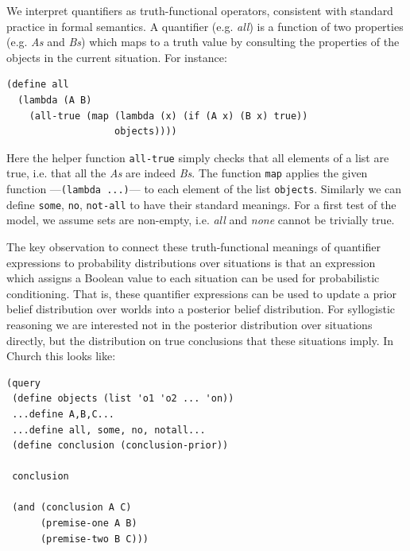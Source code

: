 \documentclass[10pt,letterpaper]{article}
\begin{document}
%
%




We interpret quantifiers as truth-functional operators, consistent with standard practice in formal semantics.
A quantifier (e.g. \emph{all}) is a function of two properties (e.g. \emph{As} and \emph{Bs}) which maps to a truth value by consulting the properties of the objects in the current situation. For instance:
\begin{lstlisting}
(define all 
  (lambda (A B) 
    (all-true (map (lambda (x) (if (A x) (B x) true)) 
                   objects))))
\end{lstlisting}
Here the helper function \lstinline{all-true} simply checks that all elements of a list are true, i.e. that all the \emph{As} are indeed \emph{Bs}. The function \lstinline{map} applies the given function ---\lstinline{(lambda ...)}--- to each element of the list \lstinline{objects}. Similarly we can define \lstinline{some}, \lstinline{no}, \lstinline{not-all} to have their standard meanings. For a first test of the model, we assume sets are non-empty, i.e. \emph{all} and \emph{none} cannot be trivially true.

The key observation to connect these truth-functional meanings of quantifier expressions to probability distributions over situations is that an expression which assigns a Boolean value to each situation can be used for probabilistic conditioning. That is, these quantifier expressions can be used to update a prior belief distribution over worlds into a posterior belief distribution. For syllogistic reasoning we are interested not in the posterior distribution over situations directly, but the distribution on true conclusions that these situations imply. In Church this looks like:
\begin{lstlisting}
(query
 (define objects (list 'o1 'o2 ... 'on))
 ...define A,B,C...
 ...define all, some, no, notall...
 (define conclusion (conclusion-prior))
 
 conclusion
 
 (and (conclusion A C) 
      (premise-one A B)
      (premise-two B C)))
\end{lstlisting}
\end{document}
